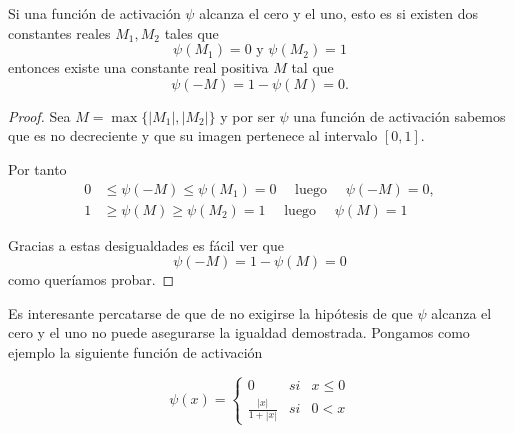 \begin{lema} \label{lema:propio_1_antes_teorema_2_5}
    Si una función de activación  $\psi$ alcanza el cero y el uno, esto es 
    si existen dos constantes reales $M_1, M_2$ 
    tales que 
    \begin{equation}
        \psi(M_1) = 0 \text{ y } \psi(M_2)=1
    \end{equation}
    entonces existe una constante real positiva $M$ tal que 
    \begin{equation}
        \psi(-M) = 1- \psi(M) = 0.
    \end{equation}
\end{lema}
\begin{proof}
Sea $M = \max \{|M_1|,|M_2|\}$ y por ser $\psi$ una función de activación sabemos que
es no decreciente y que su imagen pertenece al intervalo $[0,1].$

Por tanto
\begin{align}
      0 &\leq \psi(-M) \leq \psi(M_1) = 0 \quad \text{ luego } \quad \psi(-M) = 0, \\
      1 &\geq \psi(M) \geq \psi(M_2) = 1 \quad \text{ luego } \quad\psi(M) = 1
\end{align}

Gracias a estas desigualdades es fácil ver que 
\begin{equation}
    \psi(-M) = 1 - \psi(M) = 0
\end{equation}
como queríamos probar. 
\end{proof}   

Es interesante percatarse de que de no exigirse la hipótesis de 
que $\psi$ alcanza el cero y el uno no puede 
asegurarse la igualdad demostrada. Pongamos como ejemplo la siguiente función de activación

\begin{equation}
    \psi(x)= \left\{ \begin{array}{lcc}
        0 &   si  & x \leq 0 \\
        \frac{| x |}{1+ | x |}&  si & 0< x  
        \end{array}
    \right. 
\end{equation}


